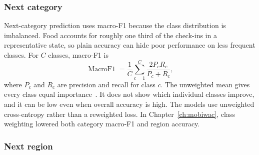 
\subsubsection{Next category}

Next-category prediction uses macro-F1 because the class distribution is imbalanced.
Food accounts for roughly one third of the check-ins in a representative state, so
plain accuracy can hide poor performance on less frequent classes. For $C$ classes,
macro-F1 is
\begin{equation}\label{eq:fund:macro-f1}
    \operatorname{MacroF1} = \frac{1}{C}\sum_{c=1}^{C}
    \frac{2P_cR_c}{P_c+R_c},
\end{equation}
where $P_c$ and $R_c$ are precision and recall for class $c$. The unweighted mean
gives every class equal importance~\cite{sokolova2009measures}. It does not show which
individual classes improve, and it can be low even when overall accuracy is high. The
models use unweighted cross-entropy rather than a reweighted loss. In
Chapter~\ref{ch:mobiwac}, class weighting lowered both category macro-F1 and region
accuracy.

\subsubsection{Next region}

